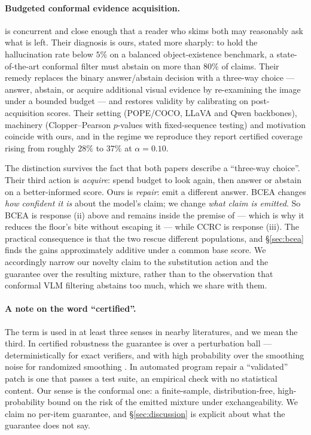 \documentclass{article}
\theoremstyle{plain}
\theoremstyle{definition}
\theoremstyle{remark}
\begin{document}
\paragraph{Budgeted conformal evidence acquisition.}
\citet{bcea} is concurrent and close enough that a reader who skims both may reasonably ask
what is left. Their diagnosis is ours, stated more sharply: to hold the hallucination rate
below $5\%$ on a balanced object-existence benchmark, a state-of-the-art conformal filter must
abstain on more than $80\%$ of claims. Their remedy replaces the binary answer/abstain decision
with a three-way choice --- answer, abstain, or acquire additional visual evidence by
re-examining the image under a bounded budget --- and restores validity by calibrating on
post-acquisition scores. Their setting (POPE/COCO, LLaVA and Qwen backbones), machinery
(Clopper--Pearson $p$-values with fixed-sequence testing) and motivation coincide with ours,
and in the regime we reproduce they report certified coverage rising from roughly $28\%$ to
$37\%$ at $\alpha=0.10$.

The distinction survives the fact that both papers describe a ``three-way choice''. Their third
action is \emph{acquire}: spend budget to look again, then answer or abstain on a better-informed
score. Ours is \emph{repair}: emit a different answer. BCEA changes \emph{how confident it is}
about the model's claim; we change \emph{what claim is emitted}. So BCEA is response (ii) above
and remains inside the premise of \citet{crcimposs} --- which is why it reduces the floor's bite
without escaping it --- while CCRC is response (iii). The practical consequence is that the two
rescue different populations, and \S\ref{sec:bcea} finds the gains approximately additive under
a common base score. We accordingly narrow our novelty claim to the substitution action and the
guarantee over the resulting mixture, rather than to the observation that conformal VLM
filtering abstains too much, which we share with them.

\paragraph{A note on the word ``certified''.}
The term is used in at least three senses in nearby literatures, and we mean the third.
In certified robustness the guarantee is over a perturbation ball --- deterministically for
exact verifiers, and with high probability over the smoothing noise for randomized smoothing
\citep{cohen2019}. In automated program repair \citep{legoues2019} a ``validated'' patch is one
that passes a test suite, an empirical check with no statistical content. Our sense is the
conformal one: a finite-sample, distribution-free, high-probability bound on the risk of the
emitted mixture under exchangeability. We claim no per-item guarantee, and
\S\ref{sec:discussion} is explicit about what the guarantee does not say.
\end{document}

